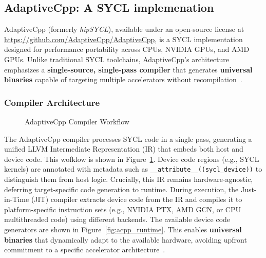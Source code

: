 \subsection{AdaptiveCpp: A SYCL implemenation}
\label{sec:adaptivecpp}
%


AdaptiveCpp (formerly \textit{hipSYCL}), available under an open-source license at 
\url{https://github.com/AdaptiveCpp/AdaptiveCpp}, is a SYCL implementation designed for performance portability
across CPUs, NVIDIA GPUs, and AMD GPUs. Unlike traditional SYCL toolchains, AdaptiveCpp’s architecture emphasizes
a \textbf{single-source, single-pass compiler} that generates \textbf{universal binaries} capable of targeting
multiple accelerators without recompilation~\cite{alpay2021}.

\subsubsection*{Compiler Architecture}

\begin{figure}[h]
    \centering
    
    \caption{AdaptiveCpp Compiler Workflow}
    \label{fig:acpp_compiler_workflow}
\end{figure}

The AdaptiveCpp compiler processes SYCL code in a single pass, generating a unified LLVM Intermediate 
Representation (IR) that embeds both host and device code. This wofklow is shown in Figure~\ref{fig:acpp_compiler_workflow}.
Device code regions (e.g., SYCL kernels) are annotated
with metadata such as \texttt{\_\_attribute\_\_((sycl\_device))} to distinguish them from host logic. Crucially,
this IR remains hardware-agnostic, deferring target-specific code generation to runtime. 
During execution, the Just-in-Time (JIT) compiler extracts device code from the IR and compiles it to platform-specific instruction 
sets (e.g., NVIDIA PTX, AMD GCN, or CPU multithreaded code) using different backends.
The available device code generators are shown in Figure~\ref{fig:acpp_runtime}.
This enables \textbf{universal binaries} that dynamically adapt to the available hardware, avoiding upfront commitment to a
specific accelerator architecture~\cite{SYCL2020}.

